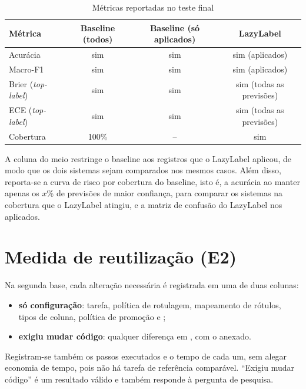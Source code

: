 \begin{table}[htb]
  \centering
  \caption{Métricas reportadas no teste final}
  \label{tab:metricas-desenho}
  \begin{tabular}{lccc}
    \toprule
    Métrica & Baseline (todos) & Baseline (só aplicados) & LazyLabel \\
    \midrule
    Acurácia & sim & sim & sim (aplicados) \\
    Macro-F1 & sim & sim & sim (aplicados) \\
    Brier (\emph{top-label}) & sim & sim & sim (todas as previsões) \\
    ECE (\emph{top-label}) & sim & sim & sim (todas as previsões) \\
    Cobertura & 100\% & -- & sim \\
    \bottomrule
  \end{tabular}
\end{table}

A coluna do meio restringe o baseline aos registros que o LazyLabel aplicou, de modo que os dois sistemas sejam comparados nos mesmos casos. Além disso, reporta-se a curva de risco por cobertura do baseline, isto é, a acurácia ao manter apenas os $x$\% de previsões de maior confiança, para comparar os sistemas na cobertura que o LazyLabel atingiu, e a matriz de confusão do LazyLabel nos aplicados.

\section{Medida de reutilização (E2)}

Na segunda base, cada alteração necessária é registrada em uma de duas colunas:

\begin{itemize}
  \item \textbf{só configuração}: tarefa, política de rotulagem, mapeamento de rótulos, tipos de coluna, política de promoção e ;
  \item \textbf{exigiu mudar código}: qualquer diferença em , com o  anexado.
\end{itemize}

Registram-se também os passos executados e o tempo de cada um, sem alegar economia de tempo, pois não há tarefa de referência comparável. ``Exigiu mudar código'' é um resultado válido e também responde à pergunta de pesquisa.

